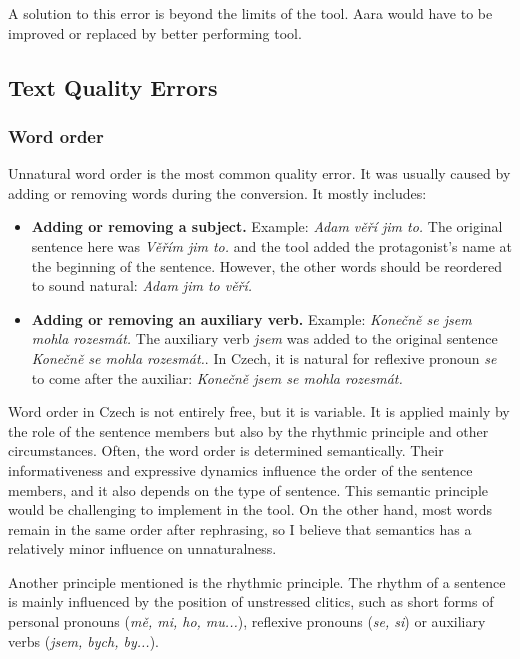 A solution to this error is beyond the limits of the tool. Aara would have to be improved or replaced by better performing tool.

\subsection{Text Quality Errors}

\subsubsection{Word order}

Unnatural word order is the most common quality error. It was usually caused by adding or removing words during the conversion. It mostly includes:

\begin{itemize}
	\item \textbf{Adding or removing a subject.} Example: \emph{Adam věří jim to.} The original sentence here was \emph{Věřím jim to.} and the tool added the protagonist's name at the beginning of the sentence. However, the other words should be reordered to sound natural: \emph{Adam jim to věří.}
	\item \textbf{Adding or removing an auxiliary verb.} Example: \emph{Konečně se jsem mohla rozesmát.} The auxiliary verb \emph{jsem} was added to the original sentence \emph{Konečně se mohla rozesmát.}. In Czech, it is natural for reflexive pronoun \emph{se} to come after the auxiliar: \emph{Konečně jsem se mohla rozesmát.}
\end{itemize}

Word order in Czech is not entirely free, but it is variable. It is applied mainly by the role of the sentence members but also by the rhythmic principle and other circumstances. Often, the word order is determined semantically. Their informativeness and expressive dynamics influence the order of the sentence members, and it also depends on the type of sentence. \cite{vlasin-slovnik} This semantic principle would be challenging to implement in the tool. On the other hand, most words remain in the same order after rephrasing, so I believe that semantics has a relatively minor influence on unnaturalness.

Another principle mentioned is the rhythmic principle. The rhythm of a sentence is mainly influenced by the position of unstressed clitics, such as short forms of personal pronouns (\emph{mě, mi, ho, mu...}), reflexive pronouns (\emph{se, si}) or auxiliary verbs (\emph{jsem, bych, by...}). \cite{vlasin-slovnik}

